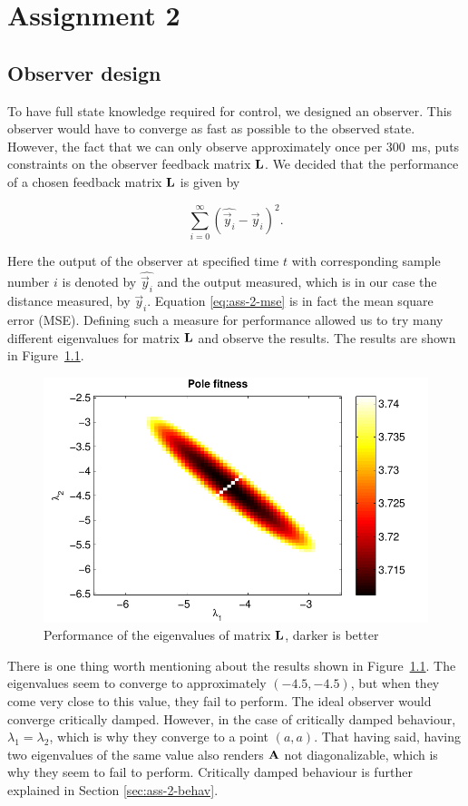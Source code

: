 \documentclass[11pt,titlepage]{report}
\begin{document}
\chapter{Assignment 2}
\section{Observer design}
To have full state knowledge required for control, we designed an observer. This observer would have to converge as fast as possible to the observed state. However, the fact that we can only observe approximately once per \SI{300}{ms}, puts constraints on the observer feedback matrix $\mathbf{L}$. We decided that the performance of a chosen feedback matrix $\mathbf{L}$ is given by

\begin{equation} \label{eq:ass-2-mse}
	\sum_{i=0}^{\infty} (\hat{\vec{y}_i}-\vec{y}_i)^2.
\end{equation}

Here the output of the observer at specified time $t$ with corresponding sample number $i$ is denoted by $\hat{\vec{y}_i}$ and the output measured, which is in our case the distance measured, by $\vec{y}_i$. Equation \ref{eq:ass-2-mse} is in fact the mean square error (MSE). Defining such a measure for performance allowed us to try many different eigenvalues for matrix $\mathbf{L}$ and observe the results. The results are shown in Figure~\ref{fig:ass-2-eigs}.

\begin{figure}[H]
	\begin{center}
		\includegraphics[width=.7\linewidth]{resource/pole-fitness.pdf}
	\end{center}
	\caption{Performance of the eigenvalues of matrix $\mathbf{L}$, darker is better}
	\label{fig:ass-2-eigs}
\end{figure}

There is one thing worth mentioning about the results shown in Figure~\ref{fig:ass-2-eigs}. The eigenvalues seem to converge to approximately $(-4.5,-4.5)$, but when they come very close to this value, they fail to perform. The ideal observer would converge critically damped. However, in the case of critically damped behaviour, $\lambda_1 = \lambda_2$, which is why they converge to a point $(a,a)$. That having said, having two eigenvalues of the same value also renders $\mathbf{A}$ not diagonalizable, which is why they seem to fail to perform. Critically damped behaviour is further explained in Section \ref{sec:ass-2-behav}.
\end{document}
